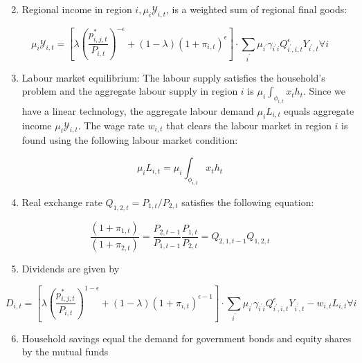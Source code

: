 \documentclass[\latexroot/\projectname]{subfiles}
\begin{document}
\begin{enumerate}
  \setcounter{enumi}{1}
  \item Regional income in region $i, \mu_{i} \mathcal{Y}_{i, t}$, is a weighted sum of regional final goods:
\end{enumerate}

$$
\mu_{i} \mathcal{Y}_{i, t}=\left[\lambda\left(\frac{p_{i, j, t}^{*}}{P_{i, t}}\right)^{-\epsilon}+(1-\lambda)\left(1+\pi_{i, t}\right)^{\epsilon}\right] \cdot \sum_{i^{\prime}} \mu_{i^{\prime}} \gamma_{i^{\prime} i} Q_{i^{\prime}, i, t}^{\epsilon} Y_{i^{\prime}, t} \forall i
$$

\begin{enumerate}
  \setcounter{enumi}{2}
  \item Labour market equilibrium: The labour supply satisfies the household's problem and the aggregate labour supply in region $i$ is $\mu_{i} \int_{\phi_{i, t}} x_{t} h_{t}$. Since we have a linear technology, the aggregate labour demand $\mu_{i} L_{i, t}$ equals aggregate income $\mu_{i} \mathcal{Y}_{i, t}$. The wage rate $w_{i, t}$ that clears the labour market in region $i$ is found using the following labour market condition:
\end{enumerate}

$$
\mu_{i} L_{i, t}=\mu_{i} \int_{\phi_{i, t}} x_{t} h_{t}
$$

\begin{enumerate}
  \setcounter{enumi}{3}
  \item Real exchange rate $Q_{1,2, t}=P_{1, t} / P_{2, t}$ satisfies the following equation:
\end{enumerate}

$$
\frac{\left(1+\pi_{1, t}\right)}{\left(1+\pi_{2, t}\right)}=\frac{P_{2, t-1}}{P_{1, t-1}} \frac{P_{1, t}}{P_{2, t}}=Q_{2,1, t-1} Q_{1,2, t}
$$

\begin{enumerate}
  \setcounter{enumi}{4}
  \item Dividends are given by
\end{enumerate}

$$
D_{i, t}=\left[\lambda\left(\frac{p_{i, j, t}^{*}}{P_{i, t}}\right)^{1-\epsilon}+(1-\lambda)\left(1+\pi_{i, t}\right)^{\epsilon-1}\right] \cdot \sum_{i^{\prime}} \mu_{i^{\prime}} \gamma_{i^{\prime} i} Q_{i^{\prime}, i, t}^{\epsilon} Y_{i^{\prime}, t}-w_{i, t} L_{i, t} \forall i
$$

\begin{enumerate}
  \setcounter{enumi}{5}
  \item Household savings equal the demand for government bonds and equity shares by the mutual funds
\end{enumerate}
\end{document}
